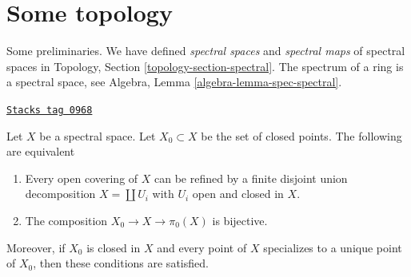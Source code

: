 \section{Some topology}
\label{proetale-section-topology}
Some preliminaries. We have defined {\it spectral spaces} and
{\it spectral maps} of spectral spaces in
Topology, Section \ref{topology-section-spectral}.
The spectrum of a ring is a spectral space, see
Algebra, Lemma \ref{algebra-lemma-spec-spectral}.

\begin{lemma}
\label{proetale-lemma-spectral-split}
\href{https://stacks.math.columbia.edu/tag/0968}{\texttt{Stacks tag 0968}}

Let $X$ be a spectral space. Let $X_0 \subset X$ be the set of closed points.
The following are equivalent
\begin{enumerate}
\item Every open covering of $X$ can be refined by a finite
disjoint union decomposition $X = \coprod U_i$ with $U_i$
open and closed in $X$.
\item The composition $X_0 \to X \to \pi_0(X)$ is bijective.
\end{enumerate}
Moreover, if $X_0$ is closed in $X$ and every point of $X$ specializes
to a unique point of $X_0$, then these conditions are satisfied.
\end{lemma}


